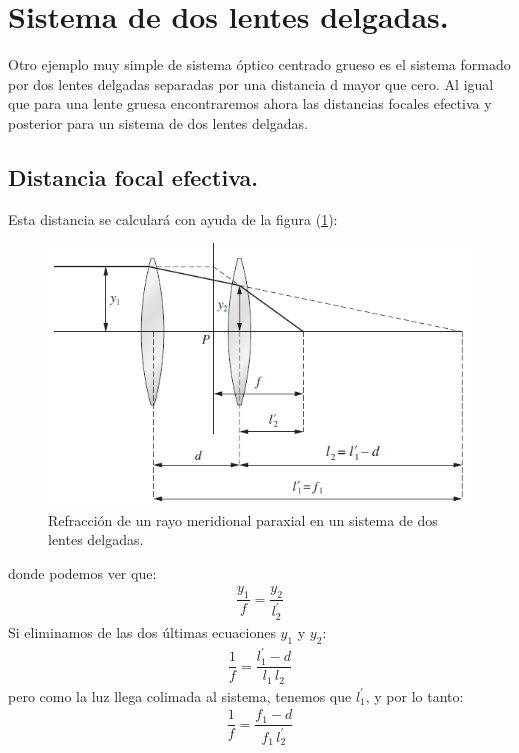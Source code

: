 \documentclass[14pt]{extarticle}
\begin{document}
\section{Sistema de dos lentes delgadas.}

Otro ejemplo muy simple de sistema óptico centrado grueso es el sistema formado por dos lentes delgadas separadas por una distancia d mayor que cero. Al igual que para una lente gruesa encontraremos ahora las distancias focales efectiva y posterior para un sistema de dos lentes delgadas.

\subsection{Distancia focal efectiva.}

Esta distancia se calculará con ayuda de la figura (\ref{fig:figura_III_08}):
\begin{figure}[H]
    \centering
    \includegraphics[scale=0.7]{Imagenes/Lentes_Sistema_01.png}
    \caption{Refracción de un rayo meridional paraxial en un sistema de dos lentes delgadas.}
    \label{fig:figura_III_08}
\end{figure}
donde podemos ver que:
\begin{align}
\dfrac{y_{1}}{f} = \dfrac{y_{2}}{l_{2}^{\prime}}
\label{eq:ecuacion_III_31}
\end{align}
Si eliminamos de las dos últimas ecuaciones $y_{1}$ y $y_{2}$:
\begin{align}
\dfrac{1}{f} = \dfrac{l_{1}^{\prime} - d}{l_{1} \, l_{2}}
\label{eq:ecuacion_III_33}
\end{align}
pero como la luz llega colimada al sistema, tenemos que $l_{1}^{\prime}$, y por lo tanto:
\begin{align}
\dfrac{1}{f} = \dfrac{f_{1} - d}{f_{1} \, l_{2}^{\prime}}
\label{eq:ecuacion_III_34}
\end{align}
\end{document}
